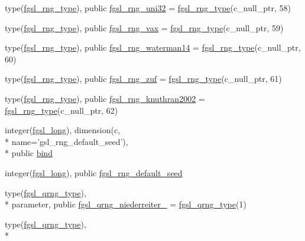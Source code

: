 \begin{DoxyCompactItemize}
\item 
type(\hyperlink{structfgsl_1_1fgsl__rng__type}{fgsl\-\_\-rng\-\_\-type}), public \hyperlink{classfgsl_a762bd46602bef4b69b29c76cbb184687}{fgsl\-\_\-rng\-\_\-uni32} = \hyperlink{structfgsl_1_1fgsl__rng__type}{fgsl\-\_\-rng\-\_\-type}(c\-\_\-null\-\_\-ptr, 58)
\item 
type(\hyperlink{structfgsl_1_1fgsl__rng__type}{fgsl\-\_\-rng\-\_\-type}), public \hyperlink{classfgsl_a85a32537847b642a47c056213ad0c1a6}{fgsl\-\_\-rng\-\_\-vax} = \hyperlink{structfgsl_1_1fgsl__rng__type}{fgsl\-\_\-rng\-\_\-type}(c\-\_\-null\-\_\-ptr, 59)
\item 
type(\hyperlink{structfgsl_1_1fgsl__rng__type}{fgsl\-\_\-rng\-\_\-type}), public \hyperlink{classfgsl_a47b92bfccacd568a2f9c08efbc2cb660}{fgsl\-\_\-rng\-\_\-waterman14} = \hyperlink{structfgsl_1_1fgsl__rng__type}{fgsl\-\_\-rng\-\_\-type}(c\-\_\-null\-\_\-ptr, 60)
\item 
type(\hyperlink{structfgsl_1_1fgsl__rng__type}{fgsl\-\_\-rng\-\_\-type}), public \hyperlink{classfgsl_a43051f5642335d5741ab956a7c9cdb64}{fgsl\-\_\-rng\-\_\-zuf} = \hyperlink{structfgsl_1_1fgsl__rng__type}{fgsl\-\_\-rng\-\_\-type}(c\-\_\-null\-\_\-ptr, 61)
\item 
type(\hyperlink{structfgsl_1_1fgsl__rng__type}{fgsl\-\_\-rng\-\_\-type}), public \hyperlink{classfgsl_a4148e5146be887be4fac343f69ce9399}{fgsl\-\_\-rng\-\_\-knuthran2002} = \hyperlink{structfgsl_1_1fgsl__rng__type}{fgsl\-\_\-rng\-\_\-type}(c\-\_\-null\-\_\-ptr, 62)
\item 
integer(\hyperlink{classfgsl_a22fca1111887118eb07d5f9688ea38ad}{fgsl\-\_\-long}), dimension(c, \\*
name='gsl\-\_\-rng\-\_\-default\-\_\-seed'), \\*
public \hyperlink{classfgsl_a64406a5e119fa92e47b1adcddb152e91}{bind}
\item 
integer(\hyperlink{classfgsl_a22fca1111887118eb07d5f9688ea38ad}{fgsl\-\_\-long}), public \hyperlink{classfgsl_a26af265921be65d7d401bd4865dfe221}{fgsl\-\_\-rng\-\_\-default\-\_\-seed}
\item 
type(\hyperlink{structfgsl_1_1fgsl__qrng__type}{fgsl\-\_\-qrng\-\_\-type}), \\*
parameter, public \hyperlink{classfgsl_a3b034ddb20e620b652a5fe35050c0beb}{fgsl\-\_\-qrng\-\_\-niederreiter\-\_} = \hyperlink{structfgsl_1_1fgsl__qrng__type}{fgsl\-\_\-qrng\-\_\-type}(1)
\item 
type(\hyperlink{structfgsl_1_1fgsl__qrng__type}{fgsl\-\_\-qrng\-\_\-type}), \\*

\end{DoxyCompactItemize}
